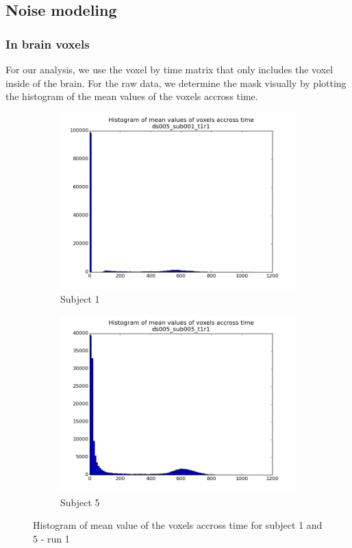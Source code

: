 \subsection{Noise modeling}
\subsubsection{In brain voxels}

For our analysis, we use the voxel by time matrix that only includes the voxel 
inside of the brain. For the raw data, we determine the mask visually by plotting
the histogram of the mean values of the voxels accross time.

\begin{figure}[H]
\begin{subfigure}{.5\textwidth}
  \centering
  \includegraphics[width=.9\linewidth]{../fig/histograms/ds005_sub001_t1r1_hist.png}
  \caption{Subject 1}
  \label{fig:hista}
\end{subfigure}%
\begin{subfigure}{.5\textwidth}
  \centering
  \includegraphics[width=.9\linewidth]{../fig/histograms/ds005_sub005_t1r1_hist.png}
  \caption{Subject 5}
  \label{fig:histb}
\end{subfigure}
\caption{Histogram of mean value of the voxels accross time for subject 1 and 5 - run 1}
\label{fig:hist}
\end{figure}

